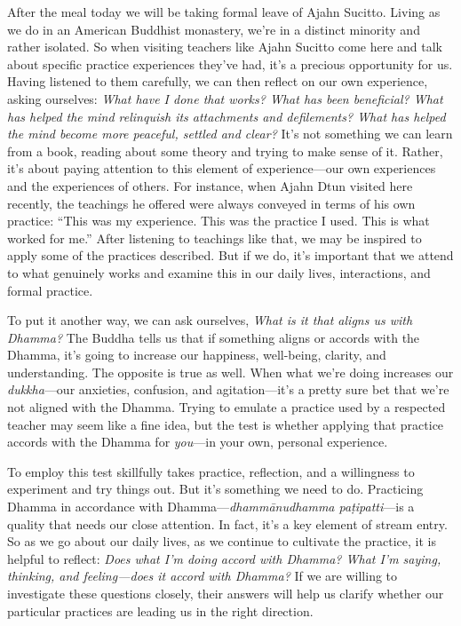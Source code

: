 After the meal today we will be taking formal leave of Ajahn Sucitto. 
Living as we do in an American Buddhist monastery, we're in a distinct 
minority and rather isolated. So when visiting teachers like Ajahn 
Sucitto come here and talk about specific practice experiences they've 
had, it's a precious opportunity for us. Having listened to them 
carefully, we can then reflect on our own experience, asking ourselves: 
\emph{What have I done that works? What has been beneficial? What has 
helped the mind relinquish its attachments and defilements? What has 
helped the mind become more peaceful, settled and clear?} It's not 
something we can learn from a book, reading about some theory and 
trying to make sense of it. Rather, it's about paying attention to this 
element of experience---our own experiences and the experiences of 
others. For instance, when Ajahn Dtun visited here recently, the 
teachings he offered were always conveyed in terms of his own practice: 
``This was my experience. This was the practice I used. This is what 
worked for me.'' After listening to teachings like that, we may be 
inspired to apply some of the practices described. But if we do, it's 
important that we attend to what genuinely works and examine this in 
our daily lives, interactions, and formal practice.

To put it another way, we can ask ourselves, \emph{What is it that 
aligns us with Dhamma?} The Buddha tells us that if something aligns or 
accords with the Dhamma, it's going to increase our happiness, 
well-being, clarity, and understanding. The opposite is true as well. 
When what we're doing increases our \emph{dukkha}---our anxieties, 
confusion, and agitation---it's a pretty sure bet that we're not 
aligned with the Dhamma. Trying to emulate a practice used by a 
respected teacher may seem like a fine idea, but the test is whether 
applying that practice accords with the Dhamma for \emph{you}---in your 
own, personal experience.

To employ this test skillfully takes practice, reflection, and a 
willingness to experiment and try things out. But it's something we 
need to do. Practicing Dhamma in accordance with 
Dhamma---\emph{dhammānudhamma paṭipatti}---is a quality that needs 
our close attention. In fact, it's a key element of stream entry. So as 
we go about our daily lives, as we continue to cultivate the practice, 
it is helpful to reflect: \emph{Does what I'm doing accord with Dhamma? 
What I'm saying, thinking, and feeling---does it accord with Dhamma?} 
If we are willing to investigate these questions closely, their answers 
will help us clarify whether our particular practices are leading us in 
the right direction.

